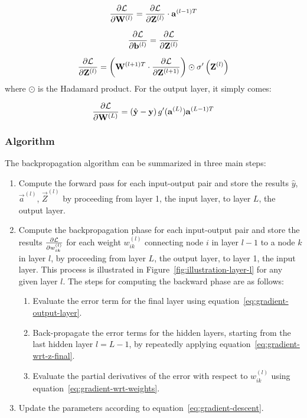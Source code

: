 \begin{equation}
    \label{eq:gradient-wrt-weights-matrix}
    \frac{\partial \mathcal{L}}{\partial \mathbf{W}^{(l)}} = \frac{\partial \mathcal{L}}{\partial \mathbf{Z}^{(l)}} \cdot \mathbf{a}^{(l-1)T}
\end{equation}

\begin{equation}
    \label{eq:gradient-wrt-bias-matrix}
    \frac{\partial \mathcal{L}}{\partial \mathbf{b}^{(l)}} = \frac{\partial \mathcal{L}}{\partial \mathbf{Z}^{(l)}}
\end{equation}

\begin{equation}
    \label{eq:gradient-wrt-z-final-matrix}
    \frac{\partial \mathcal{L}}{\partial \mathbf{Z}^{(l)}} = \left(\mathbf{W}^{(l+1)T} \cdot \frac{\partial \mathcal{L}}{\partial \mathbf{Z}^{(l+1)}} \right) \odot \sigma'\left(\mathbf{Z}^{(l)}\right)
\end{equation}
where $\odot$ is the Hadamard product. For the output layer, it simply comes:

\begin{equation}
\label{eq:gradient-output-layer}
    \frac{\partial\mathcal{L}}{\partial \mathbf{W}^{(L)}} = \left(\hat{\mathbf{y}} - \mathbf{y}\right) g'(\mathbf{a}^{(L)}) \mathbf{a}^{(L-1)T}
\end{equation}

\subsubsection{Algorithm}
The backpropagation algorithm can be summarized in three main steps:
\begin{enumerate}
    \item Compute the forward pass for each input-output pair and store the results $\hat{y}$, $\Vec{a}^{(l)}$, $\Vec{Z}^{(l)}$ by proceeding from layer 1, the input layer, to layer $L$, the output layer.
    \item Compute the backpropagation phase for each input-output pair and store the results $\frac{\partial \mathcal{L}}{\partial w_{ik}^{(l)}}$ for each weight $ w_{ik}^{(l)}$ connecting node $i$ in layer $l-1$ to a node $k$ in layer $l$, by proceeding from layer $L$, the output layer, to layer 1, the input layer. This process is illustrated in Figure~\ref{fig:illustration-layer-l} for any given layer $l$. The steps for computing the backward phase are as follows: 
    \begin{enumerate}
        \item Evaluate the error term for the final layer using equation~\eqref{eq:gradient-output-layer}.
        \item Back-propagate the error terms for the hidden layers, starting from the last hidden layer $l=L-1$, by repeatedly applying equation~\eqref{eq:gradient-wrt-z-final}.
        \item Evaluate the partial derivatives of the error with respect to $w_{ik}^{(l)}$ using equation~\eqref{eq:gradient-wrt-weights}.
    \end{enumerate}
    \item Update the parameters according to equation~\eqref{eq:gradient-descent}.
\end{enumerate}

